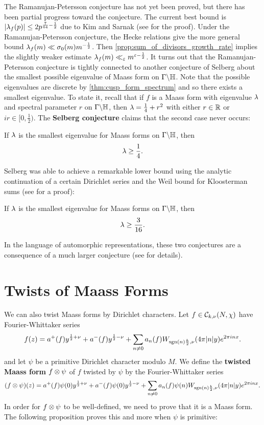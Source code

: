     The Ramanujan-Petersson conjecture has not yet been proved, but there has been partial progress toward the conjecture. The current best bound is $|\lambda_{f}(p)| \le 2p^{\frac{7}{64}-\frac{1}{2}}$ due to Kim and Sarnak (see \cite{kim2003functoriality} for the proof). Under the Ramanujan-Petersson conjecture, the Hecke relations give the more general bound $\lambda_{f}(m) \ll \sigma_{0}(m)m^{-\frac{1}{2}}$. Then \cref{prop:sum_of_divisors_growth_rate} implies the slightly weaker estimate $\lambda_{f}(m) \ll_{\varepsilon} m^{\varepsilon-\frac{1}{2}}$. It turns out that the Ramanujan-Petersson conjecture is tightly connected to another conjecture of Selberg about the smallest possible eigenvalue of Maass form on $\Gamma\backslash\mathbb{H}$. Note that the possible eigenvalues are discrete by \cref{thm:cusp_form_spectrum} and so there exists a smallest eigenvalue. To state it, recall that if $f$ is a Maass form with eigenvalue $\lambda$ and spectral parameter $r$ on $\Gamma\backslash\mathbb{H}$, then $\lambda = \frac{1}{4}+r^{2}$ with either $r \in \mathbb{R}$ or $ir \in [0,\frac{1}{2})$. The \textbf{Selberg conjecture} claims that the second case never occurs:

    \begin{conjecture*}
      If $\lambda$ is the smallest eigenvalue for Maass forms on $\Gamma\backslash\mathbb{H}$, then
      \[
        \lambda \ge \frac{1}{4}.
      \]
    \end{conjecture*}

    Selberg was able to achieve a remarkable lower bound using the analytic continuation of a certain Dirichlet series and the Weil bound for Kloosterman sums (see \cite{iwaniec2002spectral} for a proof):

    \begin{theorem}
      If $\lambda$ is the smallest eigenvalue for Maass forms on $\Gamma\backslash\mathbb{H}$, then
      \[
        \lambda \ge \frac{3}{16}.
      \]
    \end{theorem}

    In the language of automorphic representations, these two conjectures are a consequence of a much larger conjecture (see \cite{blomer2013role} for details).
  \section{Twists of Maass Forms}
    We can also twist Maass forms by Dirichlet characters. Let $f \in \mathcal{C}_{k,\nu}(N,\chi)$ have Fourier-Whittaker series
    \[
      f(z) = a^{+}(f)y^{\frac{1}{2}+\nu}+a^{-}(f)y^{\frac{1}{2}-\nu}+\sum_{n \neq 0}a_{n}(f)W_{\operatorname{\mathrm{sgn}}(n)\frac{k}{2},\nu}(4\pi|n|y)e^{2\pi inx}.
    \]
    and let $\psi$ be a primitive Dirichlet character modulo $M$. We define the \textbf{twisted Maass form} $f \otimes \psi$ of $f$ twisted by $\psi$ by the Fourier-Whittaker series
    \[
      (f \otimes \psi)(z) = a^{+}(f)\psi(0)y^{\frac{1}{2}+\nu}+a^{-}(f)\psi(0)y^{\frac{1}{2}-\nu}+\sum_{n \neq 0}a_{n}(f)\psi(n)W_{\operatorname{\mathrm{sgn}}(n)\frac{k}{2},\nu}(4\pi|n|y)e^{2\pi inx}.
    \]
    In order for $f \otimes \psi$ to be well-defined, we need to prove that it is a Maass form. The following proposition proves this and more when $\psi$ is primitive:

